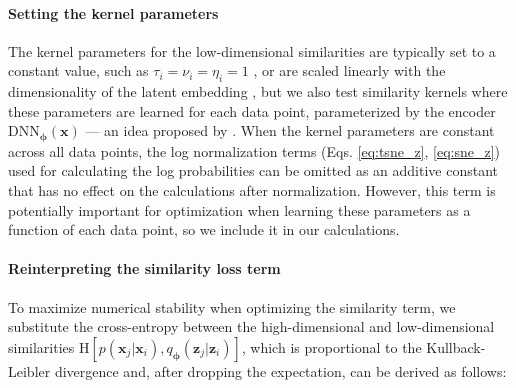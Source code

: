 \documentclass[11pt,a4paper,twoside]{book}
\begin{document}
\begin{doublespace}
\begin{appendices}
\paragraph{Setting the kernel parameters} The kernel parameters for the low-dimensional similarities are typically set to a constant value, such as $\tau_i = \nu_i = \eta_i = 1$ \citep{maaten2008tsne}, or are scaled linearly with the dimensionality of the latent embedding \citep{van2009ptsne}, but we also test similarity kernels where these parameters are learned for each data point, parameterized by the encoder $\mathrm{DNN}_{\boldsymbol{\phi}}(\mathbf{x})$ --- an idea proposed by \cite{van2009ptsne}. When the kernel parameters are constant across all data points, the log normalization terms (Eqs. \ref{eq:tsne_z}, \ref{eq:sne_z}) used for calculating the log probabilities can be omitted as an additive constant that has no effect on the calculations after normalization. However, this term is potentially important for optimization when learning these parameters as a function of each data point, so we include it in our calculations.

\paragraph{Reinterpreting the similarity loss term} To maximize numerical stability when optimizing the similarity term, we substitute the cross-entropy between the high-dimensional and low-dimensional similarities $\mathrm{H}[p(\mathbf{x}_j | \mathbf{x}_i), q_{\boldsymbol{\phi}}(\mathbf{z}_j | \mathbf{z}_i)]$, which is proportional to the Kullback-Leibler divergence and, after dropping the expectation, can be derived as follows:


\end{appendices}
\end{doublespace}
\end{document}
